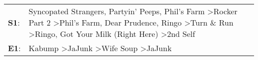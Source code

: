 \begin{supertabular}{p{0.03\textwidth}p{0.92\textwidth}}
 \textbf{S1}:  &  Syncopated Strangers\textsuperscript{}, \enspace Partyin' Peeps\textsuperscript{}, \enspace Phil's Farm\textsuperscript{} \textgreater \enspace Rocker Part 2\textsuperscript{} \textgreater \enspace Phil's Farm\textsuperscript{}, \enspace Dear Prudence\textsuperscript{}, \enspace Ringo\textsuperscript{} \textgreater \enspace Turn \& Run\textsuperscript{} \textgreater \enspace Ringo\textsuperscript{}, \enspace Got Your Milk (Right Here)\textsuperscript{} \textgreater \enspace 2nd Self\textsuperscript{}  \enspace  \\
 \textbf{E1}:  &                                                                                                                                                                                                                                                                                                                                                   Kabump\textsuperscript{} \textgreater \enspace JaJunk\textsuperscript{} \textgreater \enspace Wife Soup\textsuperscript{} \textgreater \enspace JaJunk\textsuperscript{}  \enspace  \\
\end{supertabular}
